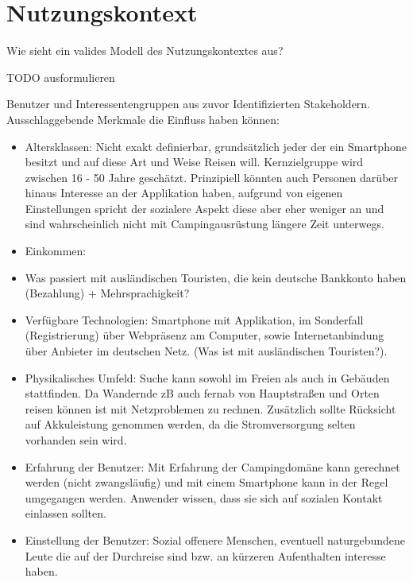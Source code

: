
\section{Nutzungskontext}

Wie sieht ein valides Modell des Nutzungskontextes aus?	  
 
TODO ausformulieren

Benutzer und Interessentengruppen aus zuvor Identifizierten Stakeholdern. Ausschlaggebende Merkmale die Einfluss haben können:
\begin{itemize}
   \item Altersklassen: Nicht exakt definierbar, grundsätzlich jeder der ein Smartphone besitzt und auf diese Art und Weise Reisen will. Kernzielgruppe wird zwischen 16 - 50 Jahre geschätzt. Prinzipiell könnten auch Personen darüber hinaus Interesse an der Applikation haben, aufgrund von eigenen Einstellungen spricht der sozialere Aspekt diese aber eher weniger an und sind wahrscheinlich nicht mit Campingausrüstung längere Zeit unterwegs.

   \item Einkommen:

   \item Was passiert mit ausländischen Touristen, die kein deutsche Bankkonto haben (Bezahlung) + Mehrsprachigkeit?

   \item Verfügbare Technologien: Smartphone mit Applikation, im Sonderfall (Registrierung) über Webpräsenz am Computer, sowie Internetanbindung über Anbieter im deutschen Netz. (Was ist mit ausländischen Touristen?).  
   
   \item Physikalisches Umfeld: Suche kann sowohl im Freien als auch in Gebäuden stattfinden. Da Wandernde zB auch fernab von Hauptstraßen und Orten reisen können ist mit Netzproblemen zu rechnen. Zusätzlich sollte Rücksicht auf Akkuleistung genommen werden, da die Stromversorgung selten vorhanden sein wird.

    \item Erfahrung der Benutzer: Mit Erfahrung der Campingdomäne kann gerechnet werden (nicht zwangsläufig) und mit einem Smartphone kann in der Regel umgegangen werden. Anwender wissen, dass sie sich auf sozialen Kontakt einlassen sollten.

    \item Einstellung der Benutzer: Sozial offenere Menschen, eventuell naturgebundene Leute die auf der Durchreise sind bzw. an kürzeren Aufenthalten interesse haben.  


\end{itemize}

 